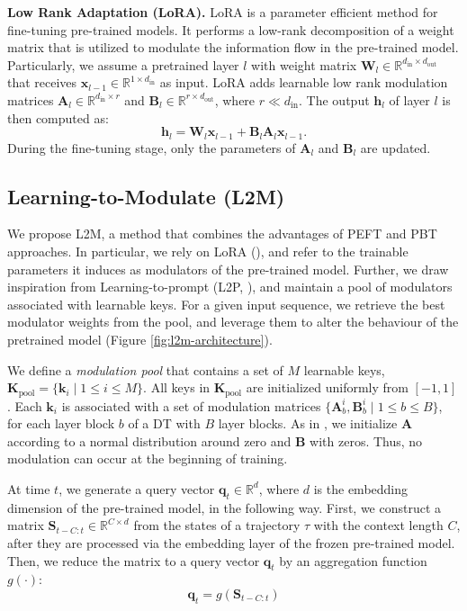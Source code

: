 \documentclass{article}
\begin{document}
\textbf{Low Rank Adaptation (LoRA).} 
LoRA \citep{Hu:21} is a parameter efficient method for fine-tuning pre-trained models.
It performs a low-rank decomposition of a weight matrix that is utilized to modulate the information flow in the pre-trained model.
Particularly, we assume a pretrained layer $l$ with weight matrix $\bm{W}_l \in \mathbb{R}^{d_{\text{in}}\times d_{\text{out}}}$ that receives $\bm{x}_{l-1} \in \mathbb{R} ^ {1\times d_{\text{in}}}$ as input.
LoRA adds learnable low rank modulation matrices $\bm{A}_l \in \mathbb{R}^{d_{\text{in}}\times r}$ and $\bm{B}_l \in \mathbb{R}^{r \times d_{\text{out}}}$, where $r \ll d_{\text{in}}$.
The output $\bm{h}_l$ of layer $l$ is then computed as:
\begin{equation}\label{eq:lora}
    \bm{h}_l = \bm{W}_l\bm{x}_{l-1} +  \bm{B}_l\bm{A}_l\bm{x}_{l-1}.
\end{equation}
During the fine-tuning stage, only the parameters of $\bm{A}_l$ and $\bm{B}_l$ are updated.



\subsection{Learning-to-Modulate (L2M)}
\label{sec:l2m}
We propose L2M, a method that combines the advantages of PEFT and PBT approaches.
In particular, we rely on LoRA (\citealp{Hu:21}), and refer to the trainable parameters it induces  as modulators of the pre-trained model. 
Further, we draw inspiration from Learning-to-prompt (L2P, \citealp{Wang:22}), and maintain a pool of modulators associated with learnable keys. 
For a given input sequence, we retrieve the best modulator weights from the pool, and leverage them to alter the behaviour of the pretrained model (Figure \ref{fig:l2m-architecture}). 


We define a \emph{modulation pool} that contains a set of $M$ learnable keys, $\mathbf{K}_{\text{pool}} = \{\mathbf{k}_i \mid 1 \leq i \leq M \}$.
All keys in $\mathbf{K}_{\text{pool}}$ are initialized uniformly from $[-1, 1]$. 
Each $\mathbf{k}_i$ is associated with a set of modulation matrices $\{ \mathbf{A}_{b}^i, \mathbf{B}_{b}^i \mid 1 \leq b \leq B\}$, for each layer block $b$ of a DT with $B$ layer blocks. As in \citet{Hu:21}, we initialize $\mathbf{A}$ according to a normal distribution around zero and $\mathbf{B}$ with zeros.
Thus, no modulation can occur at the beginning of training.

At time $t$, we generate a query vector $\mathbf{q}_t \in \mathbb{R}^{d}$, where $d$ is the embedding dimension of the pre-trained model, in the following way.
First, we construct a matrix $\mathbf{S}_{t-C:t} \in \mathbb{R}^{C\times d}$ from the states of a trajectory $\tau$ with the context length $C$, after they are processed via the embedding layer of the frozen pre-trained model.
Then, we reduce the matrix to a query vector $\mathbf{q}_t$ by an aggregation function $g(\cdot)$:
{
\setlength{\abovedisplayskip}{3pt}
\setlength{\belowdisplayskip}{3pt}
\begin{equation}
    \mathbf{q}_t = g(\mathbf{S}_{t-C:t})
\end{equation}
}
\end{document}
